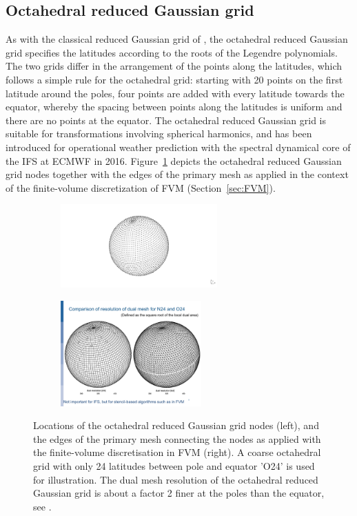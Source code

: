 \documentclass[gmd, manuscript]{copernicus}
\begin{document}
\subsection{Octahedral reduced Gaussian grid} \label{sec:grid_oct}
\label{subsection:octahedralreducedgaussiangrid}

As with the classical reduced Gaussian grid of \cite{hortal1991use}, the octahedral 
reduced Gaussian grid \citep{malardel2016new,smolarkiewiczetalJCP2016} specifies the latitudes according to the 
roots of the Legendre polynomials. 
The two grids differ in the arrangement of the points along the latitudes, which follows a simple
rule for the octahedral grid: starting with 20 points on the first latitude around the poles, four points 
are added with every latitude towards the equator, whereby the spacing between points along the 
latitudes is uniform and there are no points at the equator. The octahedral reduced Gaussian grid 
is suitable for transformations involving spherical harmonics, and has been introduced for operational 
weather prediction with the spectral dynamical core of the IFS at ECMWF in 2016. 
Figure~\ref{fig:octahedralgrid} depicts the octahedral reduced Gaussian grid nodes together with
the edges of the primary mesh as applied in the context of the finite-volume discretization of FVM (Section~\ref{sec:FVM}). 


\begin{figure}
\centering
\begin{subfigure}{.4\textwidth}
  \centering
  \includegraphics[width=6cm]{contributions/FVM/octahedral_gauss_nodes}
 \end{subfigure}%
\begin{subfigure}{.4\textwidth}
  \centering
  \includegraphics[width=5.4cm]{contributions/FVM/octahedral_RGG_white}
 \end{subfigure}
\caption{Locations of the octahedral reduced Gaussian grid nodes (left), and the edges of the primary mesh 
connecting the nodes as applied with the finite-volume discretisation in FVM (right). A coarse octahedral grid with only
24 latitudes between pole and equator 'O24' is used for illustration. The dual mesh resolution of the octahedral
reduced Gaussian grid is about a factor 2 finer at the poles than the equator, see \cite{smolarkiewiczetalJCP2016}.}
\label{fig:octahedralgrid}
\end{figure}
\end{document}
